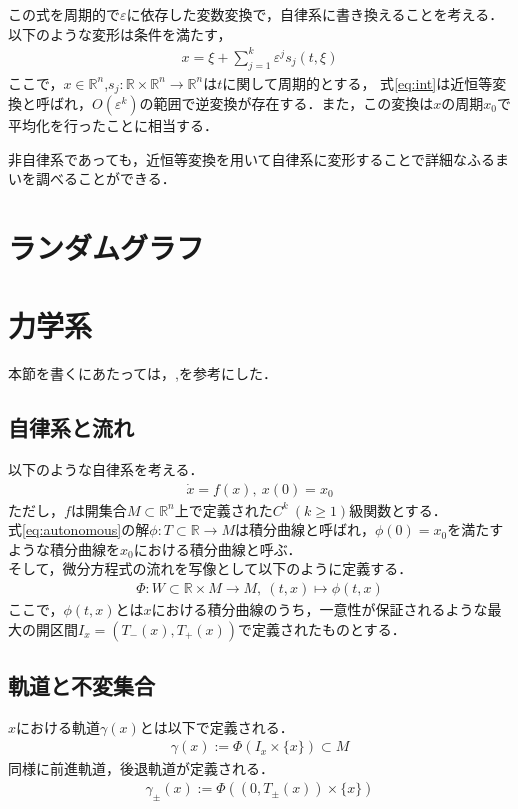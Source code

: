 \documentclass[../main]{subfiles}
\begin{document}
この式を周期的で$\varepsilon$に依存した変数変換で，自律系に書き換えることを考える．
以下のような変形は条件を満たす，
\begin{align}
    \label{eq:int}
    x=\xi+\sum_{j=1}^k \varepsilon^j s_j(t,\xi)
\end{align}
ここで，$x\in\mathbb{R}^n$,$s_j:\mathbb{R}\times\mathbb{R}^n\to\mathbb{R}^n$は$t$に関して周期的とする，
式\eqref{eq:int}は近恒等変換と呼ばれ，$O(\varepsilon^k)$の範囲で逆変換が存在する．また，この変換は$x$の周期$x_0$で平均化を行ったことに相当する．

非自律系であっても，近恒等変換を用いて自律系に変形することで詳細なふるまいを調べることができる．
\section{ランダムグラフ}
\section{力学系}
本節を書くにあたっては，\cite{teschlordinary},\cite{Ciesielski+2012+2110+2128}を参考にした．
\subsection{自律系と流れ}
以下のような自律系を考える．
\begin{align}
    \label{eq:autonomous}
    \dot{x}=f(x),\ x(0)=x_0
\end{align}
ただし，$f$は開集合$M\subset \mathbb{R}^n$上で定義された$C^k\ (k\geq 1)$級関数とする．\\
式\eqref{eq:autonomous}の解$\phi:T\subset \mathbb{R}\to M$は積分曲線と呼ばれ，$\phi(0)=x_0$を満たすような積分曲線を$x_0$における積分曲線と呼ぶ．\\
そして，微分方程式の流れを写像として以下のように定義する．
\begin{align*}
    \Phi:W\subset\mathbb{R}\times M\to M,\ (t,x)\mapsto \phi(t,x)
\end{align*}
ここで，$\phi(t,x)$とは$x$における積分曲線のうち，一意性が保証されるような最大の開区間$I_x=(T_-(x),T_+(x))$で定義されたものとする．
\subsection{軌道と不変集合}
$x$における軌道$\gamma(x)$とは以下で定義される．
\begin{align*}
    \gamma(x):=\Phi(I_x\times \{x\})\subset M
\end{align*}
同様に前進軌道，後退軌道が定義される．
\begin{align*}
    \gamma_\pm(x):=\Phi((0,T_\pm (x))\times \{x\})
\end{align*}
\end{document}
